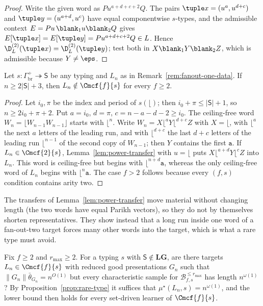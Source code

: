 \begin{proof}
Write the given word as $Pu^{a+d+c+2}Q$.  The pairs
$\tuple x=(u^a,u^{d+c})$ and $\tuple y=(u^{a+d},u^c)$ have equal
componentwise $s$-types, and the admissible context
$E=Pu\,\blank_1u\blank_2Q$ gives
$E[\tuple x]=E[\tuple y]=Pu^{a+d+c+2}Q\in L$.  Hence
$\D^{(2)}_L(\tuple x)=\D^{(2)}_L(\tuple y)$; test both in
$X\blank_1Y\blank_2Z$, which is admissible because $Y\ne\eps$.
\end{proof}

\begin{theorem}
\label{thm:doubling-no-lift}
Let $s:\Gamma_{\mathrm{br}}^+\twoheadrightarrow\mathsf S$ be any typing
and $L_n$ as in
Remark~\ref{rem:fanout-one-data}.  If $n\ge2|\mathsf S|+3$,
then $L_n\notin\Cmcf{f}{s}$ for every $f\ge2$.
\end{theorem}

\begin{proof}
Let $i_0,\pi$ be the index and period of $s(\lfloor)$; then
$i_0+\pi\le|\mathsf S|+1$, so $n\ge2i_0+\pi+2$.  Put $a=i_0$, $d=\pi$,
$c=n-a-d-2\ge i_0$.  The ceiling-free word
$W_n=\lfloor W_{n-1}W_{n-1}\rfloor$ starts with $\lfloor^n$.  Write
$W_n=X\lfloor^aY\lfloor^{d+c}Z$ with $X=\lfloor$, with $\lfloor^a$ the next
$a$ letters of the leading run, and with $\lfloor^{d+c}$ the last $d+c$
letters of the leading run $\lfloor^{n-1}$ of the second copy of
$W_{n-1}$; then $Y$ contains the first $\mathtt a$.  If
$L_n\in\Cmcf{2}{s}$, Lemma~\ref{lem:power-transfer} with $u=\lfloor$
puts $X\lfloor^{a+d}Y\lfloor^cZ$ into $L_n$.  This word is ceiling-free
but begins with $\lfloor^{n+d}\mathtt a$, whereas the only ceiling-free
word of $L_n$ begins with $\lfloor^n\mathtt a$.  The case $f>2$ follows
because every $(f,s)$ condition contains arity two.
\end{proof}

\begin{remark}
The transfers of Lemma~\ref{lem:power-transfer} move material without
changing length (the two words have equal Parikh vectors), so they do
not by themselves shorten representatives.  They show instead that a
long run inside one word of a fan-out-two target forces many other words
into the target, which is what a rare type must avoid.
\end{remark}

\begin{openproblem}
\label{op:fanout-two}
Fix $f\ge2$ and $r_{\max}\ge2$.  For a typing $s$ with
$\mathsf S\notin\mathbf{LG}$, are there targets $L_n\in\Cmcf{f}{s}$ with
reduced good presentations $G_n$ such that
$\|G_n\|\bar\theta_{G_n}=n^{O(1)}$ but every characteristic sample for
$\mathcal B^{\le r_{\max}}_{f,s}$ has length $n^{\omega(1)}$?  By
Proposition~\ref{prop:rare-type} it suffices that
$\mu^\star(L_n,s)=n^{\omega(1)}$, and the lower bound then holds for every
set-driven learner of $\Cmcf{f}{s}$.
\end{openproblem}

